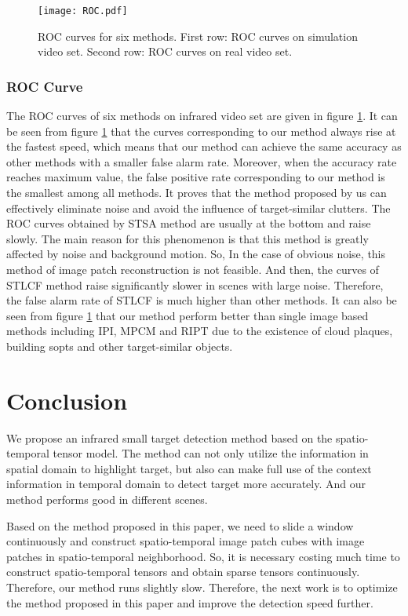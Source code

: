 \documentclass[journal]{IEEEtran}
\begin{document}
\begin{figure}[htb]
  \centering
  \texttt{[image: ROC.pdf]}
  \caption{ROC curves for six methods. First row: ROC curves on simulation video set. Second row: ROC curves on real video set.}
  \label{ROC}
\end{figure}

\subsubsection{ROC Curve}
The ROC curves of six methods on infrared video set are given in figure \ref{ROC}. It can be seen from figure \ref{ROC} that the curves corresponding to our method always rise at the fastest speed, which means that our method can achieve the same accuracy as other methods with a smaller false alarm rate. Moreover, when the accuracy rate reaches maximum value, the false positive rate corresponding to our method is the smallest among all methods. It proves that the method proposed by us can effectively eliminate noise and avoid the influence of target-similar clutters. The ROC curves obtained by STSA method are usually at the bottom and raise slowly. The main reason for this phenomenon is that this method is greatly affected by noise and background motion. So, In the case of obvious noise, this method of image patch reconstruction is not feasible. And then, the curves of STLCF method raise significantly slower in scenes with large noise. Therefore, the false alarm rate of STLCF is much higher than other methods. It can also be seen from figure \ref{ROC} that our method perform better than single image based methods including IPI, MPCM and RIPT due to the existence of cloud plaques, building sopts and other target-similar objects.


\section{Conclusion}
We propose an infrared small target detection method based on the spatio-temporal tensor model. The method can not only utilize the information in spatial domain to highlight target, but also can make full use of the context information in temporal domain to detect target more accurately. And our method performs good in different scenes.

Based on the method proposed in this paper, we need to slide a window continuously and construct spatio-temporal image patch cubes with image patches in spatio-temporal neighborhood. So, it is necessary costing much time to construct spatio-temporal tensors and obtain sparse tensors continuously. Therefore, our method runs slightly slow. Therefore, the next work is to optimize the method proposed in this paper and improve the detection speed further.
\end{document}
